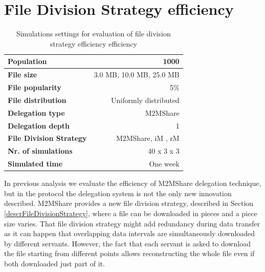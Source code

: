 
\pagebreak 
\section{File Division Strategy efficiency}
\begin{table}[h]
\begin{center}
\begin{tabular}{|l|r|}
\hline
\bfseries Population & 1000 \\
\hline
\bfseries File size & 3.0 MB, 10.0 MB, 25.0 MB \\
\hline
\bfseries File popularity & 5\% \\
\hline
\bfseries File distribution & Uniformly distributed \\
\hline
\bfseries Delegation type & M2MShare \\
\hline
\bfseries Delegation depth & 1 \\
\hline
\bfseries File Division Strategy & M2MShare, iM , rM \\
\hline
\bfseries Nr. of simulations & 40 x 3 x 3\\
\hline
\bfseries Simulated time & One week \\
\hline
\end{tabular}
\end{center}
\caption{Simulations settings for evaluation of file division strategy efficiency efficiency\label{tab:settingsFDS}}
\end{table}
In previous analysis we evaluate the efficiency of M2MShare delegation technique, but in the protocol the delegation system is not the only new innovation described. M2MShare provides a new file division strategy, described in Section \ref{descrFileDivisionStrategy}, where a file can be downloaded in pieces and a piece size varies. That file division strategy might add redundancy during data transfer as it can happen that overlapping data intervals are simultaneously downloaded by different servants. However, the fact that each servant is asked to download the file starting from different points allows reconstructing the whole file even if both downloaded just part of it. \\

